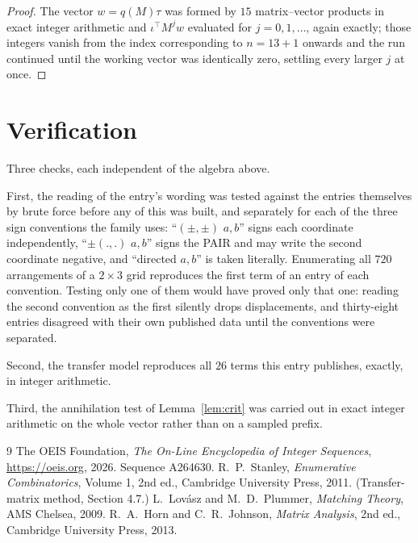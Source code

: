 \documentclass[11pt,a4paper]{article}
\theoremstyle{plain}
\theoremstyle{definition}
\begin{document}
\begin{proof}
The vector $w=q(M)\tau$ was formed by $15$ matrix--vector products in exact integer
arithmetic and $\iota^{\!\top}M^{j}w$ evaluated for $j=0,1,\dots$, again exactly; those
integers vanish from the index corresponding to $n=13+1$ onwards and the run continued
until the working vector was identically zero, settling every larger $j$ at once.
\end{proof}

\section{Verification}

Three checks, each independent of the algebra above.

First, the reading of the entry's wording was tested against the entries themselves by brute
force before any of this was built, and separately for each of the three sign conventions the
family uses: ``$(\pm,\pm)$ $a,b$'' signs each coordinate independently, ``$\pm(.,.)$ $a,b$''
signs the PAIR and may write the second coordinate negative, and ``directed $a,b$'' is taken
literally. Enumerating all $720$ arrangements of a $2\times3$ grid reproduces the first term
of an entry of each convention. Testing only one of them would have proved only that one:
reading the second convention as the first silently drops displacements, and thirty-eight
entries disagreed with their own published data until the conventions were separated.

Second, the transfer model reproduces all $26$ terms this entry publishes, exactly, in
integer arithmetic.

Third, the annihilation test of Lemma~\ref{lem:crit} was carried out in exact integer
arithmetic on the whole vector rather than on a sampled prefix.

\begin{thebibliography}{9}
 The OEIS Foundation, \emph{The On-Line Encyclopedia of Integer
Sequences}, \url{https://oeis.org}, 2026. Sequence A264630.
 R.~P.~Stanley, \emph{Enumerative Combinatorics}, Volume 1, 2nd ed.,
Cambridge University Press, 2011. (Transfer-matrix method, Section 4.7.)
 L.~Lov\'asz and M.~D.~Plummer, \emph{Matching Theory}, AMS Chelsea, 2009.
 R.~A.~Horn and C.~R.~Johnson, \emph{Matrix Analysis}, 2nd ed., Cambridge
University Press, 2013.
\end{thebibliography}
\end{document}
